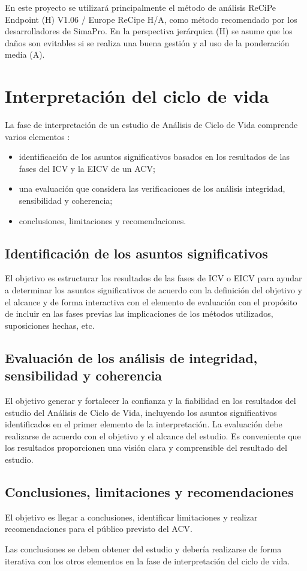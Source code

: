 En este proyecto se utilizará principalmente el método de análisis ReCiPe Endpoint (H) V1.06 / Europe ReCipe H/A, como método recomendado por los desarrolladores de SimaPro. En la perspectiva jerárquica (H) se asume que los daños son evitables si se realiza una buena gestión y al uso de la ponderación media (A).

\section{Interpretación del ciclo de vida}

La fase de interpretación de un estudio de Análisis de Ciclo de Vida comprende varios elementos \cite{iso14044}:
\begin{itemize}
  \item identificación de los asuntos significativos basados en los resultados de las fases del ICV y la EICV de un ACV;
  \item una evaluación que considera las verificaciones de los análisis integridad, sensibilidad y coherencia;
  \item conclusiones, limitaciones y recomendaciones.
\end{itemize}

\subsection{Identificación de los asuntos significativos}

El objetivo es estructurar los resultados de las fases de ICV o EICV para ayudar a determinar los asuntos significativos de acuerdo con la definición del objetivo y el alcance y de forma interactiva con el elemento de evaluación con el propósito de incluir en las fases previas las implicaciones de los métodos utilizados, suposiciones hechas, etc.

\subsection{Evaluación de los análisis de integridad, sensibilidad y coherencia}

El objetivo generar y fortalecer la confianza y la fiabilidad en los resultados del estudio del Análisis de Ciclo de Vida, incluyendo los asuntos significativos identificados en el primer elemento de la interpretación. La evaluación debe realizarse de acuerdo con el objetivo y el alcance del estudio. Es conveniente que los resultados proporcionen una visión clara y comprensible del resultado del estudio.

\subsection{Conclusiones, limitaciones y recomendaciones}

El objetivo es llegar a conclusiones, identificar limitaciones y realizar recomendaciones para el público previsto del ACV.

Las conclusiones se deben obtener del estudio y debería realizarse de forma iterativa con los otros elementos en la fase de interpretación del ciclo de vida.
